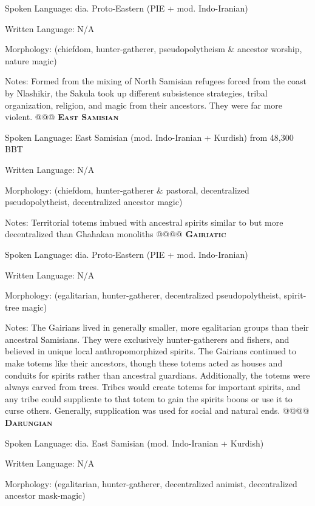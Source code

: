 \documentclass[12pt]{article}
\begin{document}
\begin{easylist}
	\normalfont Spoken Language: dia. Proto-Eastern (PIE + mod. Indo-Iranian) %
	
	Written Language: N/A
	
	Morphology: (chiefdom, hunter-gatherer, pseudopolytheism \& ancestor worship, nature magic)
	
	{\footnotesize Notes: Formed from the mixing of North Samisian refugees forced from the coast by Nlashikir, the Sakula took up different subsistence strategies, tribal organization, religion, and magic from their ancestors. They were far more violent.}
	@@@ \textsc{\textbf{East Samisian}}
	
	\normalfont Spoken Language: East Samisian (mod. Indo-Iranian + Kurdish) from 48,300 BBT
	
	Written Language: N/A
	
	Morphology: (chiefdom, hunter-gatherer \& pastoral, decentralized pseudopolytheist, decentralized ancestor magic)
	
	{\footnotesize Notes: Territorial totems imbued with ancestral spirits similar to but more decentralized than Ghahakan monoliths}
	@@@@ \textsc{\textbf{Gairiatic}}
	
	\normalfont Spoken Language: dia. Proto-Eastern (PIE + mod. Indo-Iranian)
	
	Written Language: N/A
	
	Morphology: (egalitarian, hunter-gatherer, decentralized pseudopolytheist, spirit-tree magic)
	
	{\footnotesize Notes: The Gairians lived in generally smaller, more egalitarian groups than their ancestral Samisians. They were exclusively hunter-gatherers and fishers, and believed in unique local anthropomorphized spirits. The Gairians continued to make totems like their ancestors, though these totems acted as houses and conduits for spirits rather than ancestral guardians. Additionally, the totems were always carved from trees. Tribes would create totems for important spirits, and any tribe could supplicate to that totem to gain the spirits boons or use it to curse others. Generally, supplication was used for social and natural ends.}
	@@@@ \textsc{\textbf{Darungian}}
	
	\normalfont Spoken Language: dia. East Samisian (mod. Indo-Iranian + Kurdish)
	
	Written Language: N/A
	
	Morphology: (egalitarian, hunter-gatherer, decentralized animist, decentralized ancestor mask-magic)
	

\end{easylist}
\end{document}
